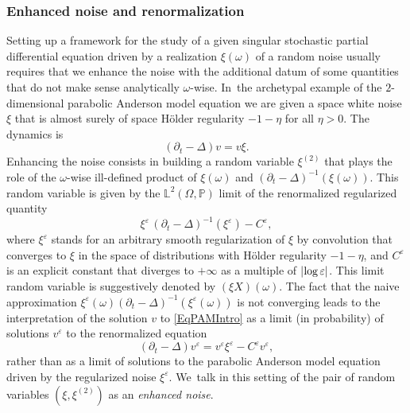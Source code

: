 \documentclass[10pt]{amsart}
\theoremstyle{definition}
\let\epsilon\varepsilon
\newcommand{\bbL}{\mathbb{L}}
\begin{document}
\subsubsection{Enhanced noise and renormalization} Setting up a framework for the study of a given singular stochastic partial differential equation driven by a realization $\xi(\omega)$ of a random noise usually requires that we enhance the noise with the additional datum of some quantities that do not make sense analytically $\omega$\nobreakdash-wise. In~the archetypal example of the $2$-dimensional parabolic Anderson model equation we are given a space white noise $\xi$ that is almost surely of space Hölder regularity $-1-\eta$ for all $\eta>0$. The dynamics is
\begin{equation} \label{EqPAMIntro}
(\partial_t-\Delta)v = v\xi.
\end{equation}
Enhancing the noise consists in building a random variable $\xi^{(2)}$ that plays the role of the $\omega$\nobreakdash-wise ill-defined product of $\xi(\omega)$ and $(\partial_t-\Delta)^{-1}(\xi(\omega))$. This random variable is given by the $\bbL^2(\Omega,\mathbb{P})$ limit of the renormalized regularized quantity
\[
\xi^\epsilon \, (\partial_t-\Delta)^{-1}(\xi^\epsilon) - C^\epsilon,
\]
where $\xi^\epsilon$ stands for an arbitrary smooth regularization of $\xi$ by convolution that converges to $\xi$ in the space of distributions with Hölder regularity $-1-\eta$, and $C^\epsilon$ is an explicit constant that diverges to $+\infty$ as a multiple of $\vert\hspace{-0.05cm}\log\epsilon\vert$. This limit random variable is suggestively denoted by $(\xi X)(\omega)$. The fact that the naive approximation $\xi^\epsilon(\omega) (\partial_t-\Delta)^{-1}(\xi^\epsilon(\omega))$ is not converging leads to the interpretation of the solution $v$ to \eqref{EqPAMIntro} as a limit (in probability) of solutions $v^\epsilon$ to the renormalized equation
\[
(\partial_t-\Delta)v^\epsilon = v^\epsilon\xi^\epsilon - C^\epsilon v^\epsilon,
\]
rather than as a limit of solutions to the parabolic Anderson model equation driven by the regularized noise $\xi^\epsilon$. We~talk in this setting of the pair of random variables $(\xi, \xi^{(2)})$ as an \emph{enhanced noise}.
\end{document}
